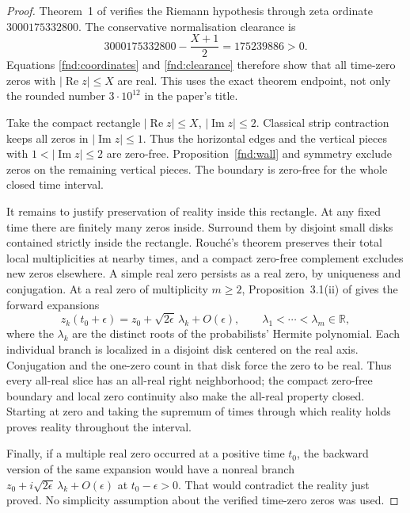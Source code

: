 \documentclass[11pt,a4paper]{article}
\theoremstyle{definition}
\theoremstyle{remark}
\newcommand{\Ree}{\operatorname{Re}}
\newcommand{\Imm}{\operatorname{Im}}
\begin{document}
\begin{proof}
Theorem~1 of \cite{PlattTrudgian} verifies the Riemann hypothesis through
zeta ordinate $3000175332800$. The conservative normalisation clearance
is
\begin{equation}
 3000175332800-\frac{X+1}{2}=175239886>0.
 \label{fnd:clearance}
\end{equation}
Equations \eqref{fnd:coordinates} and \eqref{fnd:clearance} therefore show
that all time-zero zeros with $|\Ree z|\leq X$ are real. This uses the
exact theorem endpoint, not only the rounded number $3\cdot10^{12}$ in
the paper's title.

Take the compact rectangle $|\Ree z|\leq X$, $|\Imm z|\leq2$.
Classical strip contraction keeps all zeros in $|\Imm z|\leq1$.
Thus the horizontal edges and the vertical pieces with $1<|\Imm z|\leq2$
are zero-free. Proposition~\ref{fnd:wall} and symmetry exclude zeros on
the remaining vertical pieces. The boundary is zero-free for the whole
closed time interval.

It remains to justify preservation of reality inside this rectangle.
At any fixed time there are finitely many zeros inside. Surround them by
disjoint small disks contained strictly inside the rectangle. Rouch\'e's
theorem preserves their total local multiplicities at nearby times,
and a compact zero-free complement excludes new zeros elsewhere. A simple
real zero persists as a real zero, by uniqueness and conjugation.
At a real zero of multiplicity $m\geq2$, Proposition~3.1(ii) of
\cite{Polymath} gives the forward expansions
\[
 z_k(t_0+\epsilon)
   =z_0+\sqrt{2\epsilon}\,\lambda_k+O(\epsilon),
 \qquad \lambda_1<\cdots<\lambda_m\in\mathbb R,
\]
where the $\lambda_k$ are the distinct roots of the probabilists'
Hermite polynomial. Each individual branch is localized in a disjoint
disk centered on the real axis. Conjugation and the one-zero count in
that disk force the zero to be real. Thus every all-real slice has an
all-real right neighborhood; the compact zero-free boundary and local
zero continuity also make the all-real property closed. Starting at
zero and taking the supremum of times through which reality holds proves
reality throughout the interval.

Finally, if a multiple real zero occurred at a positive time $t_0$,
the backward version of the same expansion would have a nonreal branch
$z_0+i\sqrt{2\epsilon}\,\lambda_k+O(\epsilon)$ at $t_0-\epsilon>0$.
That would contradict the reality just proved. No simplicity assumption
about the verified time-zero zeros was used.
\end{proof}
\end{document}
